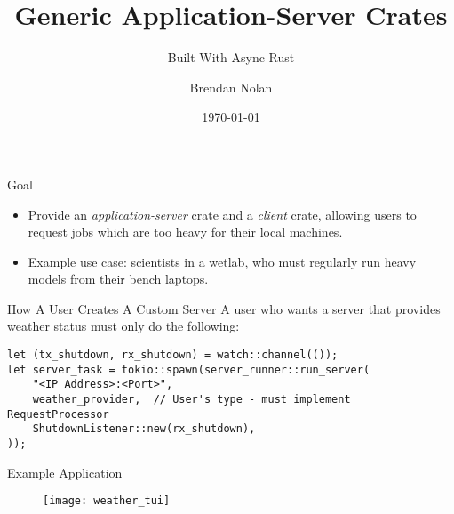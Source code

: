\documentclass{beamer}
\title[]{Generic Application-Server Crates}
\subtitle{Built With Async Rust}
\author{Brendan Nolan}
\date{\today}
\begin{document}
\begin{frame}
  \titlepage
\end{frame}

\begin{frame}{Goal}
  \begin{itemize}[<+->]
    \item<1> Provide an \emph{application-server} crate and a \emph{client} crate, allowing users to request jobs which are
          too heavy for their local machines.
    \item<2> Example use case: scientists in a wetlab, who must regularly run heavy models from their bench
          laptops.
  \end{itemize}
\end{frame}

\begin{frame}[fragile]{How A User Creates A Custom Server}
  A user who wants a server that provides weather status must only do the following:
  \begin{mdframed}[backgroundcolor=light-gray, roundcorner=10pt,leftmargin=1, rightmargin=1, innerleftmargin=1, innerrightmargin=1, innertopmargin=1,innerbottommargin=1, outerlinewidth=1, linecolor=light-gray]
    \begin{lstlisting}[basicstyle=\tiny,]
let (tx_shutdown, rx_shutdown) = watch::channel(());
let server_task = tokio::spawn(server_runner::run_server(
    "<IP Address>:<Port>",
    weather_provider,  // User's type - must implement RequestProcessor
    ShutdownListener::new(rx_shutdown),
));
    \end{lstlisting}
  \end{mdframed}
\end{frame}


\begin{frame}[fragile]{Example Application}
  \begin{figure}[htp]
    \centering
    \texttt{[image: weather\_tui]}
  \end{figure}
\end{frame}
\end{document}
